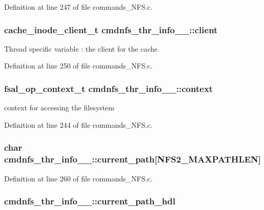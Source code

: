 Definition at line 247 of file commands\_\-NFS.c.
\subsubsection[{client}]{\setlength{\rightskip}{0pt plus 5cm}cache\_\-inode\_\-client\_\-t {\bf cmdnfs\_\-thr\_\-info\_\-\_\-::client}}\label{structcmdnfs__thr__info_____af89ea305c75cfe698a4b6c70d4ee4cae}
Thread specific variable : the client for the cache 

Definition at line 250 of file commands\_\-NFS.c.
\subsubsection[{context}]{\setlength{\rightskip}{0pt plus 5cm}fsal\_\-op\_\-context\_\-t {\bf cmdnfs\_\-thr\_\-info\_\-\_\-::context}}\label{structcmdnfs__thr__info_____ab62a259165636bd5465e7c3fee498d9b}
context for accessing the filesystem 

Definition at line 244 of file commands\_\-NFS.c.
\subsubsection[{current\_\-path}]{\setlength{\rightskip}{0pt plus 5cm}char {\bf cmdnfs\_\-thr\_\-info\_\-\_\-::current\_\-path}[NFS2\_\-MAXPATHLEN]}\label{structcmdnfs__thr__info_____a9451e8684496cc62edd93d3fbf2e4193}


Definition at line 260 of file commands\_\-NFS.c.
\subsubsection[{current\_\-path\_\-hdl}]{ {\bf cmdnfs\_\-thr\_\-info\_\-\_\-::current\_\-path\_\-hdl}}\label{structcmdnfs__thr__info_____a6a7906ceebad98937b2e0adac31a75a0}


